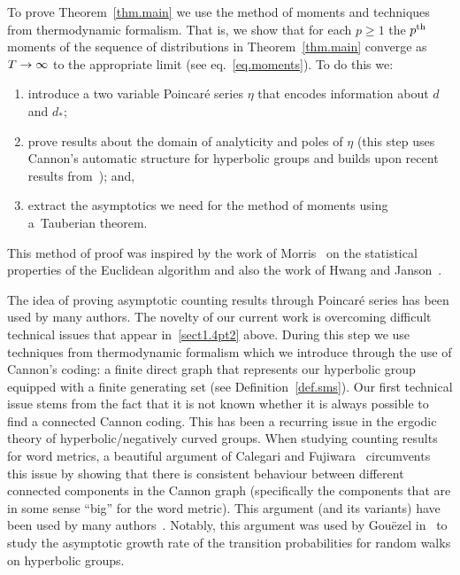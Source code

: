 \documentclass[10pt]{amsart}
\theoremstyle{definition}\newtheorem{defi}[theo]{Definition}\newtheorem{rema}[theo]{Remark}\newtheorem{exam}[theo]{Example}\newtheorem{exem}[theo]{Example}\newtheorem{nota}[theo]{Notation}
\renewcommand*{\to}{\mathchoice{\longrightarrow}{\rightarrow}{\rightarrow}{\rightarrow}}
\theoremstyle{plain}
\begin{document}
To prove Theorem~\ref{thm.main} we use the method of moments and techniques from thermodynamic formalism. That is, we show that for each $p\ge 1$ the $p^{\rm th}$ moments of the sequence of distributions in Theorem~\ref{thm.main} converge as $T\to\infty$ to the appropriate limit (see eq.~\eqref{eq.moments}). To do this we:%
\begin{enumerate}
\item\label{sect1.4pt1} introduce a two variable Poincaré series $\eta$ that encodes information about $d$ and $d_\ast$;
\item\label{sect1.4pt2} prove results about the domain of analyticity and poles of $\eta$ (this step uses Cannon's automatic structure for hyperbolic groups and builds upon recent results from~\cite{cantrell,cantrell.tanaka.2}); and, 
\item\label{sect1.4pt3} extract the asymptotics we need for the method of moments using a~{Tauberian theorem}.
\end{enumerate}
This method of proof was inspired by the work of Morris~\cite{Morris} on the statistical properties of the Euclidean algorithm and also the work of Hwang and Janson~\cite{hwang.janson}.

The idea of proving asymptotic counting results through Poincaré series has been used by many authors. The novelty of our current work is overcoming difficult technical issues that appear in~\eqref{sect1.4pt2} above. During this step we use techniques from thermodynamic formalism which we introduce through the use of Cannon's coding: a finite direct graph that represents our hyperbolic group equipped with a finite generating set (see Definition~\ref{def.sms}). Our first technical issue stems from the fact that it is not known whether it is always possible to find a connected Cannon coding. This has been a recurring issue in the ergodic theory of hyperbolic/negatively curved groups. When studying counting results for word metrics, a beautiful argument of Calegari and Fujiwara~\cite{CalegariFujiwara2010} circumvents this issue by showing that there is consistent behaviour between different connected components in the Cannon graph (specifically the components that are in some sense ``big'' for the word metric). This argument (and its variants) have been used by many authors~\cite{stats,cantrell.sert,GTT}. Notably, this argument was used by Gou\"ezel in~\cite{GouezelLocalLimit} to study the asymptotic growth rate of the transition probabilities for random walks on hyperbolic groups.
\end{document}
